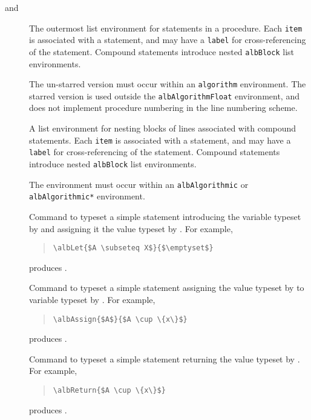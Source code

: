 \documentclass[11pt,a4paper,oneside,titlepage]{alb-corp}
\begin{document}
\begin{description}
\item[ and ] The
  outermost list environment for statements in a procedure.  Each
  \texttt{item} is associated with a statement, and may have a
  \texttt{label} for cross-referencing of the statement.  Compound
  statements introduce nested \texttt{albBlock} list environments.

  The un-starred version must occur within an \texttt{algorithm}
  environment.  The starred version is used outside the
  \texttt{albAlgorithmFloat} environment, and does not implement
  procedure numbering in the line numbering scheme.

\item[] A list environment for nesting blocks of
  lines associated with compound statements.  Each \texttt{item} is
  associated with a statement, and may have a \texttt{label} for
  cross-referencing of the statement.  Compound statements introduce
  nested \texttt{albBlock} list environments.

  The environment must occur within an \texttt{albAlgorithmic} or
  \texttt{albAlgorithmic*} environment.

\item[] Command to
  typeset a simple statement introducing the variable typeset by
   and assigning it the value typeset by .
  For example,
  \begin{quote}
\begin{verbatim}
\albLet{$A \subseteq X$}{$\emptyset$}
\end{verbatim}
  \end{quote}
  produces .

\item[] Command to
  typeset a simple statement assigning the value typeset by
   to variable typeset by .  For example,
  \begin{quote}
\begin{verbatim}
\albAssign{$A$}{$A \cup \{x\}$}
\end{verbatim}
  \end{quote}
  produces .

\item[] Command to typeset a simple
  statement returning the value typeset by .  For
  example,
  \begin{quote}
\begin{verbatim}
\albReturn{$A \cup \{x\}$}
\end{verbatim}
  \end{quote}
  produces .


\end{description}
\end{document}
